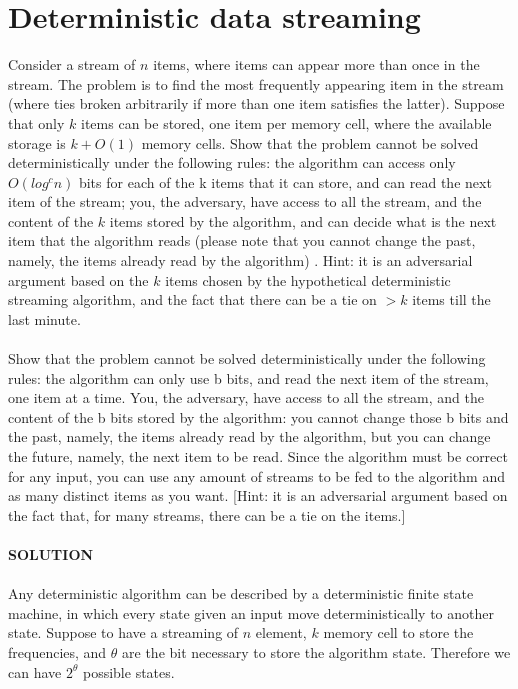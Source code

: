 \documentclass[a4paper]{article}
\begin{document}
\section*{Deterministic data streaming}
Consider a stream of $n$ items, where items can appear more than once in the stream. The problem is to find the most frequently appearing item in the stream (where ties broken arbitrarily if more than one item satisfies the latter). Suppose that only $k$ items can be stored, one item per memory cell, where the available storage is $k + O(1)$ memory cells. Show that the problem cannot be solved deterministically under the following rules: the algorithm can access only $O(log^c n)$ bits for each of the k items that it can store, and can read the next item of the stream; you, the adversary, have access to all the stream, and the content of the $k$ items stored by the algorithm, and can decide what is the next item that the algorithm reads (please note that you cannot change the past, namely, the items already read by the algorithm) . Hint: it is an adversarial argument based on the $k$ items chosen by the hypothetical deterministic streaming algorithm, and the fact that there can be a tie on $> k$ items till the last minute.\\
\\
Show that the problem cannot be solved deterministically under the following rules:
the algorithm can only use b bits, and read the next item of the stream, one item at
a time. You, the adversary, have access to all the stream, and the content of the b
bits stored by the algorithm: you cannot change those b bits and the past, namely, the
items already read by the algorithm, but you can change the future, namely, the next
item to be read. Since the algorithm must be correct for any input, you can use any
amount of streams to be fed to the algorithm and as many distinct items as you want.
[Hint: it is an adversarial argument based on the fact that, for many streams, there
can be a tie on the items.]
\\
\\
\textbf{SOLUTION}
\\
\\
Any deterministic algorithm can be described by a deterministic finite state machine, in which every state given an input move deterministically to another state. 
Suppose to have a streaming of $n$ element, $k$ memory cell to store the frequencies, and $\theta$ are the bit necessary to store the algorithm state. Therefore we can have $2^{\theta}$ possible states. \\
\end{document}
